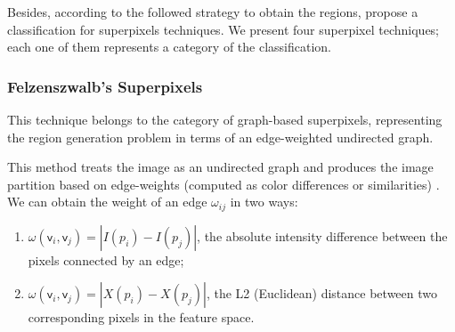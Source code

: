 Besides, according to the followed strategy to obtain the regions, \cite{Stutz.Hermans.ea:CVIU:2018} propose a classification for superpixels techniques. We present four superpixel techniques; each one of them represents a category of the classification.




\subsubsection{Felzenszwalb's Superpixels}

This technique belongs to the category of graph-based superpixels, representing the region generation problem in terms of an edge-weighted undirected graph.

This method treats the image as an undirected graph and produces the image partition based on edge-weights (computed as color differences or similarities) \citep{Felzenszwalb.Huttenlocher:IJCV:2004}. We can obtain the weight of an edge $\omega_{ij}$
in two ways:
\begin{enumerate}
	\item $\omega(\mathsf{v}_i, \mathsf{v}_j)= |I(p_i) - I(p_j)|$, the absolute intensity difference between the pixels connected by an edge; 
	\item $\omega(\mathsf{v}_i, \mathsf{v}_j)= |X(p_i) - X(p_j)|$, the L2 (Euclidean) distance between two corresponding pixels in the feature space.
\end{enumerate}

